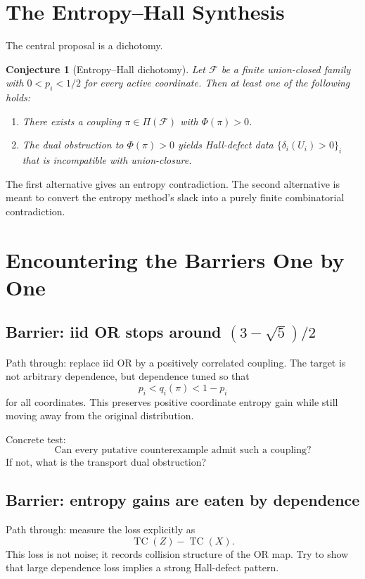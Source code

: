 \documentclass[11pt]{article}
\newtheorem{conjecture}{Conjecture}
\DeclareMathOperator{\TC}{TC}
\begin{document}
\section{The Entropy--Hall Synthesis}

The central proposal is a dichotomy.

\begin{conjecture}[Entropy--Hall dichotomy]
Let $\mathcal{F}$ be a finite union-closed family with $0<p_i<1/2$ for every
active coordinate.  Then at least one of the following holds:
\begin{enumerate}[label=(\alph*)]
  \item There exists a coupling $\pi\in\Pi(\mathcal{F})$ with
  $\Phi(\pi)>0$.
  \item The dual obstruction to $\Phi(\pi)>0$ yields Hall-defect data
  $\{\delta_i(U_i)>0\}_i$ that is incompatible with union-closure.
\end{enumerate}
\end{conjecture}

The first alternative gives an entropy contradiction.  The second alternative
is meant to convert the entropy method's slack into a purely finite
combinatorial contradiction.

\section{Encountering the Barriers One by One}

\subsection{Barrier: iid OR stops around \texorpdfstring{$(3-\sqrt{5})/2$}{(3-sqrt(5))/2}}

Path through: replace iid OR by a positively correlated coupling.  The target
is not arbitrary dependence, but dependence tuned so that
\[
  p_i < q_i(\pi) < 1-p_i
\]
for all coordinates.  This preserves positive coordinate entropy gain while
still moving away from the original distribution.

Concrete test:
\[
  \text{Can every putative counterexample admit such a coupling?}
\]
If not, what is the transport dual obstruction?

\subsection{Barrier: entropy gains are eaten by dependence}

Path through: measure the loss explicitly as
\[
  \TC(Z)-\TC(X).
\]
This loss is not noise; it records collision structure of the OR map.  Try to
show that large dependence loss implies a strong Hall-defect pattern.
\end{document}
